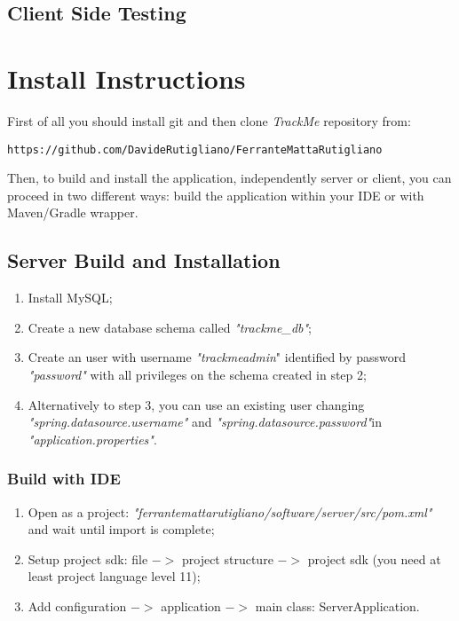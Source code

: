 \documentclass[a4paper]{article}
\begin{document}
\subsection{Client Side Testing}

\newpage
\section{Install Instructions}

First of all you should install git and then clone \textit{TrackMe} repository from:
\begin{lstlisting}
https://github.com/DavideRutigliano/FerranteMattaRutigliano
\end{lstlisting}

Then, to build and install the application, independently server or client, you can proceed in two different ways: build the application within your IDE or with Maven/Gradle wrapper.

\subsection{Server Build and Installation}
\begin{enumerate}
    \item Install MySQL;
    \item Create a new database schema called \textit{"trackme\_db"};
    \item Create an user with username \textit{"trackmeadmin}" identified by password \textit{"password"} with all privileges on the schema created in step 2; \item Alternatively to step 3, you can use an existing user changing
    \newline\textit{"spring.datasource.username"} and \textit{"spring.datasource.password"}\newline in \textit{"application.properties"}. 
\end{enumerate}

\subsubsection{Build with IDE}
\begin{enumerate}
    \item Open as a project: \textit{"ferrantemattarutigliano/software/server/src/pom.xml"} and wait until import is complete;
    \item Setup project sdk: file ${->}$ project structure ${->}$ project sdk (you need at least project language level 11);
    \item Add configuration ${->}$ application ${->}$ main class: ServerApplication.
\end{enumerate}
\end{document}
